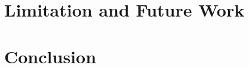 \documentclass{sigchi}
\begin{document}
\section{Limitation and Future Work}

\section{Conclusion}





\end{document}
